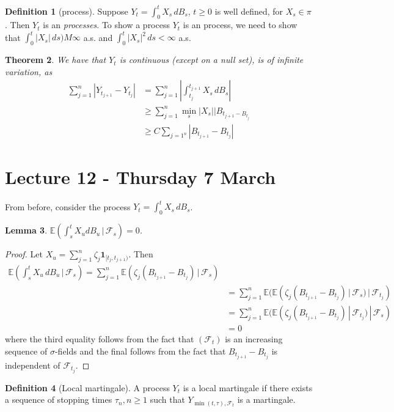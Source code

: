 \documentclass[10pt, oneside, reqno]{amsart}
\theoremstyle{plain}%
\newtheorem{thm}{Theorem}[section]
\newtheorem{lem}[thm]{Lemma}
\theoremstyle{definition}
\newtheorem{defn}[thm]{Definition}
\theoremstyle{remark}
\newcommand{\given}{ \, | \,}
\newcommand{\E}{\mathbb{E}}
\newcommand{\sigf}{\mathcal{F}}
\begin{document}
\begin{defn}[\ito process]
	Suppose $Y_t = \int_0^t X_s \, dB_s$, $t \geq 0$ is well defined, for $X_s \in \pi$. Then $Y_t$ is an \emph{\ito processes}.  To show a process $Y_t$ is an \ito process, we need to show that $\int_0^t |X_s| \, ds) M \infty$ a.s. and $\int_0^t |X_s|^2 \, ds < \infty$ a.s.
\end{defn}

\begin{thm}
	We have that $Y_t$ is continuous (except on a null set), is of infinite variation, as \begin{align*}
		\sum_{j=1}^n |Y_{t_{j+1}} - Y_{t_j} | &= \sum_{j=1}^n | \int_{t_j}^{t_{j+1}} X_s \, dB_s | \\
		 &\geq	\sum_{j=1}^n \min_{s} |X_s| |B_{t_{j+1} - B_{t_j}} \\
		&\geq C \sum_{j=1^n} |B_{t_{j+1}} - B_{t_j} |
	\end{align*}
\end{thm}

\section{Lecture 12 - Thursday 7 March} %
\label{sec:lecture_12_thursday_7_march}
From before, consider the \ito process $Y_t = \int_0^t X_s \, dB_s$.  

\begin{lem}
	$\E(\int_s^t X_u dB_u \given \sigf_s) = 0$. 
\end{lem}
\begin{proof}
	Let $X_u = \sum_{j=1}^n \zeta_j \mathbf{1}_{[t_j, t_{j+1})}$.  Then 
	\begin{align*}
		\E(\int_s^t X_u \, dB_u \given \sigf_s) = \sum_{j=1}^n \E(\zeta_j (B_{t_{j+1}} - B_{t_j}) \given \sigf_s ) \\
					&= \sum_{j=1}^n \E(\E(\zeta_j (B_{t_{j+1}} - B_{t_j}) \given \sigf_{s}) \given \sigf_{t_j}) \\
		 			&= \sum_{j=1}^n \E(\E(\zeta_j (B_{t_{j+1}} - B_{t_j}) \given \sigf_{t_j}) \given \sigf_s) \\
					&= 0
	\end{align*} where the third equality follows from the fact that $(\sigf_t)$ is an increasing sequence of $\sigma$-fields and the final follows from the fact that $B_{t_{j+1}} - B_{t_{j}}$ is independent of $\sigf_{t_j}$.  
\end{proof}

\begin{defn}[Local martingale]
	A process $Y_t$ is a local martingale if there exists a sequence of stopping times $\tau_n, n \geq 1$ such that $Y_{\min(t, \tau), \sigf_t}$ is a martingale.  
\end{defn}
\end{document}
